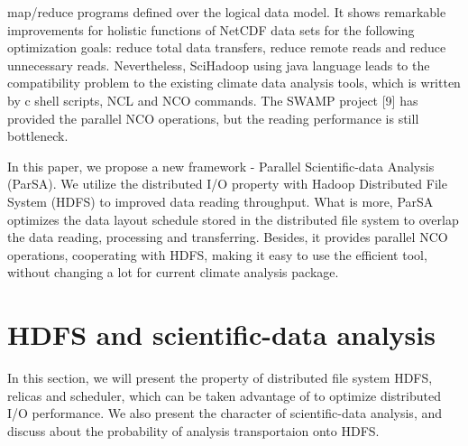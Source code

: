 \documentclass[preprint,12pt]{elsarticle}
\begin{document}
map/reduce programs defined over the logical data model. It shows remarkable improvements for holistic functions of NetCDF data sets
for the following optimization goals: reduce total data transfers, reduce remote reads and reduce unnecessary reads. Nevertheless,
SciHadoop using java language leads to the compatibility problem to the existing climate data analysis tools, which is written by c
shell scripts, NCL and NCO commands. The SWAMP project [9] has provided the parallel NCO operations, but the reading performance is
still bottleneck. \par
In this paper, we propose a new framework - Parallel Scientific-data Analysis (ParSA). We utilize the distributed I/O property with
Hadoop Distributed File System (HDFS) to improved data reading throughput. What is more, ParSA optimizes the data layout schedule
stored in the distributed file system to overlap the data reading, processing and transferring. Besides, it provides parallel NCO
operations, cooperating with HDFS, making it easy to use the efficient tool, without changing a lot for current climate analysis
package.

\section{HDFS and scientific-data analysis}
In this section, we will present the property of distributed file system HDFS, relicas and scheduler, which can be taken advantage
of to optimize distributed I/O performance. We also present the character of scientific-data analysis, and discuss about the 
probability of analysis transportaion onto HDFS.
\end{document}
